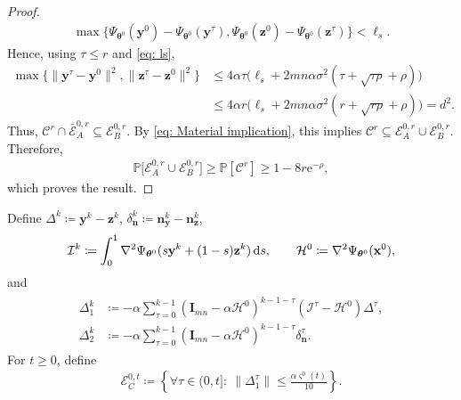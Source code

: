 \documentclass{siamart251216}
\begin{document}
\begin{proof}
    \begin{gather*}
        \max\{\Psi_{\boldsymbol{\theta}^{0}}(\mathbf{y}^{0})-\Psi_{\boldsymbol{\theta}^{0}}(\mathbf{y}^{\tau}),
        \Psi_{\boldsymbol{\theta}^{0}}(\mathbf{z}^{0})-\Psi_{\boldsymbol{\theta}^{0}}(\mathbf{z}^{\tau})\}<\ell_{s}.
    \end{gather*}
    Hence, using $\tau\leq r$ and \eqref{eq: ls},
    \begin{align*}
        \max\{\|\mathbf{y}^{\tau}-\mathbf{y}^{0}\|^{2},\|\mathbf{z}^{\tau}-\mathbf{z}^{0}\|^{2}\}
        &\leq4\alpha\tau\Big(\ell_{s}+2mn\alpha\sigma^{2}(\tau+\sqrt{\tau\rho}+\rho)\Big)\\
        &\leq4\alpha r\Big(\ell_{s}+2mn\alpha\sigma^{2}(r+\sqrt{r\rho}+\rho)\Big)=d^{2}.
    \end{align*}
    Thus, $\mathcal{C}^{r}\cap\bar{\mathcal{E}}_{A}^{0,r}\subseteq\mathcal{E}_{B}^{0,r}$. By \eqref{eq: Material implication}, this implies $\mathcal{C}^{r}\subseteq\mathcal{E}_{A}^{0,r}\cup\mathcal{E}_{B}^{0,r}$. Therefore,
    \begin{gather*}
        \mathbb{P}\Big[\mathcal{E}_{A}^{0,r}\cup\mathcal{E}_{B}^{0,r}\Big]\geq\mathbb{P}[\mathcal{C}^{r}]\geq1-8r\mathrm{e}^{-\rho},
    \end{gather*}
    which proves the result.
\end{proof}

Define $\Delta^{k}\coloneqq\mathbf{y}^{k}-\mathbf{z}^{k}$, $\delta_{\mathbf{n}}^{k}\coloneqq\mathbf{n}_{\mathbf{y}}^{k}-\mathbf{n}_{\mathbf{z}}^{k}$,
\begin{gather*}
    \mathcal{I}^{k}\coloneqq\int_{0}^{1}\nabla^{2}\Psi_{\boldsymbol{\theta}^{0}}(s\mathbf{y}^{k}+(1-s)\mathbf{z}^{k})\,\textup{d}s,\qquad \mathcal{H}^{0}\coloneqq\nabla^{2}\Psi_{\boldsymbol{\theta}^{0}}(\mathbf{x}^{0}),
\end{gather*}
and
\begin{gather}
    \label{eq: Dynamic expression}
    \begin{aligned}
        \Delta_{1}^{k}&\coloneqq-\alpha\sum_{\tau=0}^{k-1}(\mathbf{I}_{mn}-\alpha\mathcal{H}^{0})^{k-1-\tau}(\mathcal{I}^{\tau}-\mathcal{H}^{0})\Delta^{\tau},\\
        \Delta_{2}^{k}&\coloneqq-\alpha\sum_{\tau=0}^{k-1}(\mathbf{I}_{mn}-\alpha\mathcal{H}^{0})^{k-1-\tau}\delta_{\mathbf{n}}^{\tau}.
    \end{aligned}
\end{gather}
For $t\geq0$, define
\begin{gather}
    \label{eq: Event C}
    \mathcal{E}_{C}^{0,t}\coloneqq\left\{\forall\tau\in(0,t]:~\|\Delta_{1}^{\tau}\|\leq\frac{\alpha\varsigma^{0}(t)}{10}\right\}.
\end{gather}
\end{document}
